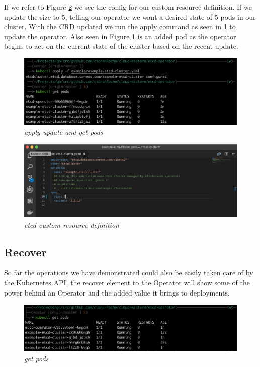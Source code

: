 If we refer to Figure \ref{img:op_9} we see the config for our custom resource definition. If we update the size to 5, telling our operator we want a desired state of 5 pods in our cluster. With the CRD updated we run the apply command as seen in \ref{img:op_8} to update the operator. Also seen in Figure \ref{img:op_8} is an added pod as the operator begins to act on the current state of the cluster based on the recent update.
\begin{figure}[!ht]
\centering
\includegraphics*[width=1\textwidth]{images/op8.png}
\caption{\em apply update and get pods}
\label{img:op_8}
\end{figure}

\begin{figure}[!ht]
\centering
\includegraphics*[width=1\textwidth]{images/op9.png}
\caption{\em etcd custom resource definition}
\label{img:op_9}
\end{figure}

\subsection{Recover}
So far the operations we have demonstrated could also be easily taken care of by the Kubernetes API, the recover element to the Operator will show some of the power behind an Operator and the added value it brings to deployments.
\begin{figure}[!ht]
\centering
\includegraphics*[width=1\textwidth]{images/op911.png}
\caption{\em get pods}
\label{img:op_11}
\end{figure}


